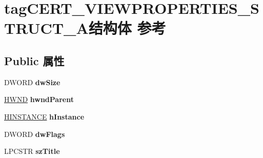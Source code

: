 \hypertarget{structtag_c_e_r_t___v_i_e_w_p_r_o_p_e_r_t_i_e_s___s_t_r_u_c_t___a}{}\section{tag\+C\+E\+R\+T\+\_\+\+V\+I\+E\+W\+P\+R\+O\+P\+E\+R\+T\+I\+E\+S\+\_\+\+S\+T\+R\+U\+C\+T\+\_\+\+A结构体 参考}
\label{structtag_c_e_r_t___v_i_e_w_p_r_o_p_e_r_t_i_e_s___s_t_r_u_c_t___a}
\subsection*{Public 属性}
\begin{DoxyCompactItemize}
\item 
\mbox{\label{structtag_c_e_r_t___v_i_e_w_p_r_o_p_e_r_t_i_e_s___s_t_r_u_c_t___a_a8daab318e183217cc471272a4862eba4}} 
D\+W\+O\+RD {\bfseries dw\+Size}
\item 
\mbox{\label{structtag_c_e_r_t___v_i_e_w_p_r_o_p_e_r_t_i_e_s___s_t_r_u_c_t___a_a20ffad33c9aac831fc430f63ccecccbb}} 
\hyperlink{interfacevoid}{H\+W\+ND} {\bfseries hwnd\+Parent}
\item 
\mbox{\label{structtag_c_e_r_t___v_i_e_w_p_r_o_p_e_r_t_i_e_s___s_t_r_u_c_t___a_ace00edb6df86767c743603481afcf2f4}} 
\hyperlink{interfacevoid}{H\+I\+N\+S\+T\+A\+N\+CE} {\bfseries h\+Instance}
\item 
\mbox{\label{structtag_c_e_r_t___v_i_e_w_p_r_o_p_e_r_t_i_e_s___s_t_r_u_c_t___a_a569f3574d0750d054b00273b5dde7d9e}} 
D\+W\+O\+RD {\bfseries dw\+Flags}
\item 
\mbox{\label{structtag_c_e_r_t___v_i_e_w_p_r_o_p_e_r_t_i_e_s___s_t_r_u_c_t___a_a4645f61ea86bf513ac71da12a985c9bf}} 
L\+P\+C\+S\+TR {\bfseries sz\+Title}
\item 
\mbox{\label{structtag_c_e_r_t___v_i_e_w_p_r_o_p_e_r_t_i_e_s___s_t_r_u_c_t___a_aedd420626242154c55eb1bad2e0cb325}} 

\end{DoxyCompactItemize}
